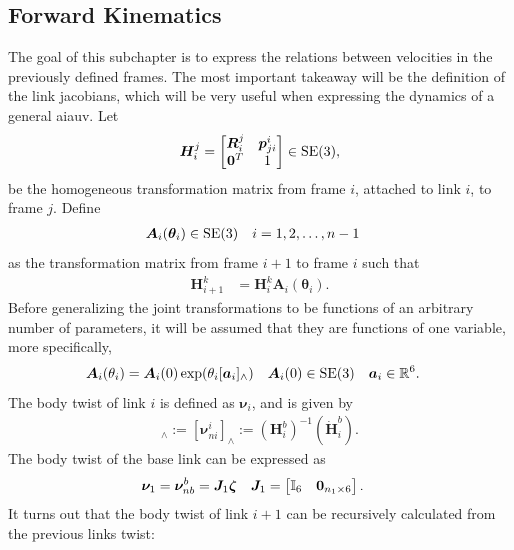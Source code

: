\subsection{Forward Kinematics}
\label{sec:forward_kinematics}
% 
The goal of this subchapter is to express the relations between velocities in
the previously defined frames. The most important takeaway will
be the definition of the link jacobians, which will be very useful when expressing
the dynamics of a general \gls{aiauv}.
Let
\begin{align}
    \bm{H}_i^j = \begin{bmatrix}
        \bm{R}_i^j & \bm{p}_{ji}^i \\
        \bm{0}^T & 1
    \end{bmatrix} \in \operatorname{SE}(3),
\end{align}
be the homogeneous transformation matrix from frame $i$, attached to link $i$,
to frame $j$. Define
\begin{align}
    \bm{A}_i(\bm{\theta}_i) &\in \operatorname{SE}(3) & i &= 1, 2, \ldots, n-1
\end{align}
as the transformation matrix from frame $i+1$ to frame $i$ such that
\begin{align}
    \bm{H}_{i+1}^k &= \bm{H}_i^k \bm{A}_i(\bm{\theta}_i). \label{eq:mod:Hi}
\end{align}
Before generalizing the joint transformations to be functions of an arbitrary number of parameters,
it will be assumed that they are functions of one variable, more specifically,
\begin{align}
    \bm{A}_i(\theta_i) &= \bm{A}_i(0) \exp(\theta_i[\bm{a}_i]_{\wedge}) & \bm{A}_i(0) &\in \operatorname{SE}(3) & \bm{a}_i&\in \mathbb{R}^6.
\end{align}
The body twist of link \(i\) is defined as $\bm{\nu}_i$, and is given by
\begin{align}
    [\bm{\nu}_i]_{\wedge} := [\bm{\nu}_{ni}^i]_{\wedge} := (\bm{H}_i^b)^{-1}(\dot{\bm{H}}_i^b).
\end{align}
The body twist of the base link can be expressed as
\begin{align}
    \bm{\nu}_1 &= \bm{\nu}_{nb}^b = \bm{J}_1 \bm{\zeta} &
    \bm{J}_1 &= \begin{bmatrix}\mathbb{I}_{6} & \bm{0}_{n_1\times6}\end{bmatrix}.
\end{align}
It turns out that the body twist of link $i+1$ can be recursively calculated from
the previous links twist:
